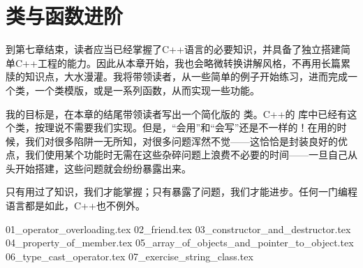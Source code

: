 \chapter{类与函数进阶}
到第七章结束，读者应当已经掌握了C++语言的必要知识，并具备了独立搭建简单C++工程的能力。因此从本章开始，我也会略微转换讲解风格，不再用长篇累牍的知识点，大水漫灌。我将带领读者，从一些简单的例子开始练习，进而完成一个类，一个类模版，或是一系列函数，从而实现一些功能。\par
我的目标是，在本章的结尾带领读者写出一个简化版的 \lstinline@string@ 类。C++的 \lstinline@string@ 库中已经有这个类，按理说不需要我们实现。但是，``会用''和``会写''还是不一样的！在用的时候，我们对很多陷阱一无所知，对很多问题浑然不觉——这恰恰是封装良好的优点，我们使用某个功能时无需在这些杂碎问题上浪费不必要的时间——一旦自己从头开始搭建，这些问题就会纷纷暴露出来。\par
只有用过了知识，我们才能掌握；只有暴露了问题，我们才能进步。任何一门编程语言都是如此，C++也不例外。\par
{01_operator_overloading.tex}
{02_friend.tex}
{03_constructor_and_destructor.tex}
{04_property_of_member.tex}
{05_array_of_objects_and_pointer_to_object.tex}
{06_type_cast_operator.tex}
{07_exercise_string_class.tex}

